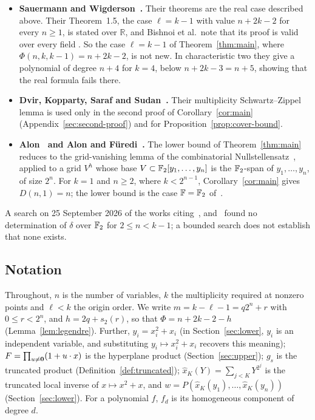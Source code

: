 \begin{itemize}
 \item \textbf{Sauermann and Wigderson~\cite{SW20}.} Their theorems are the real
 case described above. Their Theorem~1.5, the case \(\ell=k-1\) with value
 \(n+2k-2\) for every \(n\ge1\), is stated over \(\mathbb R\), and Bishnoi et al.\
 note that its proof is valid over every field \cite[Section~1.3]{BBDM23}. So the
 case \(\ell=k-1\) of Theorem~\ref{thm:main}, where \(\Phi(n,k,k-1)=n+2k-2\), is
 not new. In characteristic two they give a polynomial of degree \(n+4\) for
 \(k=4\), below \(n+2k-3=n+5\), showing that the real formula fails there.
 \item \textbf{Dvir, Kopparty, Saraf and Sudan~\cite{DKSS13}.} Their
 multiplicity Schwartz--Zippel lemma is used only in the second proof of
 Corollary~\ref{cor:main} (Appendix~\ref{sec:second-proof}) and for
 Proposition~\ref{prop:cover-bound}.
 \item \textbf{Alon~\cite{Alo99} and Alon and F\"uredi~\cite{AF93}.} The lower
 bound of Theorem~\ref{thm:main} reduces to the grid-vanishing lemma of the
 combinatorial Nullstellensatz~\cite[Lemma~2.1]{Alo99}, applied to a grid
 \(V^h\) whose base \(V\subset\mathbb F_2[y_1,\ldots,y_n]\) is the \(\mathbb F_2\)-span of
 \(y_1,\ldots,y_n\), of size \(2^n\). For \(k=1\) and \(n\ge2\), where \(k<2^{n-1}\),
 Corollary~\ref{cor:main} gives \(D(n,1)=n\); the lower bound is the case
 \(\mathbb F=\mathbb F_2\) of~\cite[Theorem~5]{AF93}.
\end{itemize}

A search on 25 September 2026 of the works citing~\cite{SW20}, \cite{BBDM23}
and~\cite{Men26} found no determination of \(\delta\) over \(\mathbb F_2\) for
\(2\le n<k-1\); a bounded search does not establish that none exists.

\subsection{Notation}

Throughout, \(n\) is the number of variables, \(k\) the multiplicity required at
nonzero points and \(\ell<k\) the origin order. We write
\(m=k-\ell-1=q2^n+r\) with \(0\le r<2^n\), and \(h=2q+s_2(r)\), so that
\(\Phi=n+2k-2-h\) (Lemma~\ref{lem:legendre}). Further,
\(y_i=x_i^2+x_i\) (in Section~\ref{sec:lower}, \(y_i\) is an independent
variable, and substituting \(y_i\mapsto x_i^2+x_i\) recovers this meaning);
\(F=\prod_{u\ne\mathbf 0}(1+u\cdot x)\) is the hyperplane product
(Section~\ref{sec:upper}); \(g_s\) is the truncated product
(Definition~\ref{def:truncated}); \(\hat x_K(Y)=\sum_{j<K}Y^{2^j}\) is the
truncated local inverse of \(x\mapsto x^2+x\), and
\(w=P(\hat x_K(y_1),\ldots,\hat x_K(y_n))\) (Section~\ref{sec:lower}). For a
polynomial \(f\), \(f_d\) is its homogeneous component of degree \(d\).

